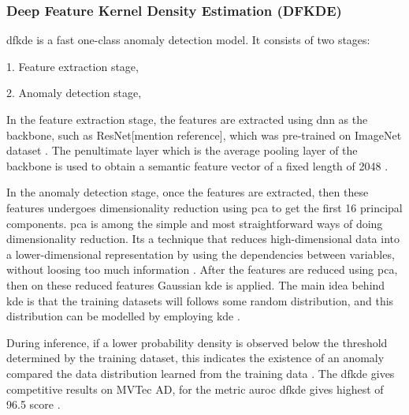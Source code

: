 \subsubsection{Deep Feature Kernel Density Estimation (DFKDE)}
\label{subsec:dfkde}

\gls{dfkde} is a fast one-class anomaly detection model. It consists of two stages:

1. Feature extraction stage,

2. Anomaly detection stage,

In the feature extraction stage, the features are extracted using \gls{dnn} as the backbone, such as ResNet[mention reference], which was pre-trained on ImageNet\cite{5206848} dataset \cite{10208786}. The penultimate layer which is the average pooling layer of the backbone is used to obtain a semantic feature vector of a fixed length of 2048 \cite{Anomalib2024}.

In the anomaly detection stage, once the features are extracted, then these features undergoes dimensionality reduction using \gls{pca}\cite{IBM2023} to get the first 16 principal components. \gls{pca} is among the simple and most straightforward ways of doing dimensionality reduction. Its a technique that reduces high-dimensional data into a lower-dimensional representation by using the dependencies between variables, without loosing too much information \cite{Shalizi2012}. After the features are reduced using \gls{pca}, then on these reduced features Gaussian \gls{kde} is applied. The main idea behind \gls{kde} is that the training datasets will follows some random distribution, and this distribution can be modelled by employing \gls{kde} \cite{10208786}.

During inference, if a lower probability density is observed below the threshold determined by the training dataset, this indicates the existence of an anomaly compared the data distribution learned from the training data \cite{10208786}. The \gls{dfkde} gives competitive results on MVTec AD\cite{8954181}, for the metric \gls{auroc} \gls{dfkde} gives highest of 96.5 score \cite{Anomalib2024}.